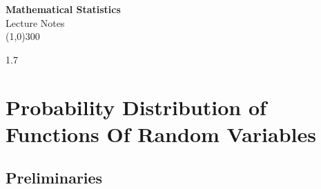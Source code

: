 \documentclass[12pt,a4paper]{report}
\theoremstyle{definition}
\theoremstyle{plain}
\begin{document}
\begin{titlepage}
\thispagestyle{empty}
\begin{center}
\vspace*{4cm}
{\Huge\bfseries Mathematical Statistics}\\[1.2cm]
{\large Lecture Notes}\\[3cm]
\line(1,0){300}
\end{center}
\clearpage
{}
\end{titlepage}













\newpage
\begin{spacing}{1.7}
\tableofcontents
{}
\end{spacing}

\newpage

















\newpage
{}





\chapter{Probability Distribution of Functions Of Random Variables}

\section{Preliminaries}
\end{document}
